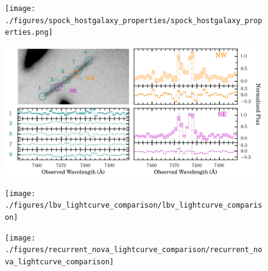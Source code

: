\documentclass{nature_arxiv}
\begin{document}
\begin{figure}[tbp]
  \begin{center}
    \texttt{[image: ./figures/spock\_hostgalaxy\_properties/spock\_hostgalaxy\_properties.png]}
    \caption{\protect}
  \end{center}
\end{figure}

\begin{figure}[tbp]
  \begin{center}
    \includegraphics[width=\textwidth]{./figures/muse_oii_sequence/muse_oii_sequence}
    \caption{\protect}
  \end{center}
\end{figure}

\begin{figure}[tbp]
  \begin{center}
    \texttt{[image: ./figures/lbv\_lightcurve\_comparison/lbv\_lightcurve\_comparison]}
    \caption{\protect}
  \end{center}
\end{figure}

\begin{figure}[tbp]
  \begin{center}
    \texttt{[image: ./figures/recurrent\_nova\_lightcurve\_comparison/recurrent\_nova\_lightcurve\_comparison]}
    \caption{\protect}
  \end{center}
\end{figure}
\end{document}
